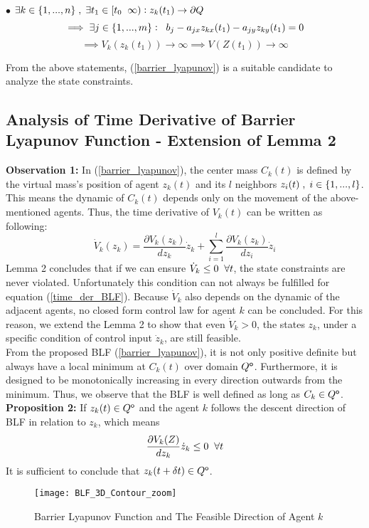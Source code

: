 \noindent $\bullet$ ${\exists k \in \{1,...,n\} \txtspc{,} \exists{t_1} \in  [t_0 \txtspc{ } \infty): z_k(t_1) \rightarrow \partial{Q}}$ 
\[\implies  \exists{j} \in \{1,...,m\}: \txtspc{} b_j - a_{jx}z_{kx}(t_1) - a_{jy}z_{ky}(t_1) = 0 \] 
\[\implies V_k(z_k(t_1)) \rightarrow \infty \implies V(Z(t_1)) \rightarrow \infty\] 

\noindent From the above statements, (\ref{barrier_lyapunov}) is a suitable candidate to analyze the state constraints.\\

\subsection {Analysis of Time Derivative of Barrier Lyapunov Function - Extension of Lemma 2} 
\noindent \textbf{Observation 1:} In (\ref{barrier_lyapunov}), the center mass ${C_k(t)}$ is defined by the virtual mass's position of agent ${z_k(t)}$ and its ${l}$ neighbors ${z_i(t) \txtspc{,} i \in \{1,...,l\}}$. This means the dynamic of ${C_k(t)}$ depends only on the movement of the above-mentioned agents. Thus, the time derivative of ${V_k(t)}$ can be written as following:
\begin{equation}
\label{time_der_BLF}
\dot V_k(z_k) = \frac{\partial V_k(z_k)}{dz_k}\dot z_k + \displaystyle\sum_{i=1}^{l} \frac{\partial V_k(z_k)}{dz_i} \dot z_i  
\end{equation}
Lemma 2 concludes that if we can ensure ${\dot V_k \leq 0 \txtspc{ }\forall t}$, the state constraints are never violated. Unfortunately this condition can not always be fulfilled for equation (\ref{time_der_BLF}). Because ${\dot{V}_k}$ also depends on the dynamic of the adjacent agents, no closed form control law for agent ${k}$ can be concluded. For this reason, we extend the Lemma 2 to show that even ${\dot V_k > 0}$, the states $z_k$, under a specific condition of control input $\dot z_k$, are still feasible. \\
From the proposed BLF (\ref{barrier_lyapunov}), it is not only positive definite but always have a local minimum at $C_k(t)$ over domain $Q^{\mathsf{o}}$. Furthermore, it is designed to be monotonically increasing in every direction outwards from the minimum. Thus, we observe that the BLF is well defined as long as $C_k \in Q^{\mathsf{o}}$.\\
\noindent \textbf{Proposition 2:} 
If $z_k(t) \in Q^{\mathsf{o}}$ and the agent $k$ follows the descent direction of BLF in relation to $z_k$, which means 
\[\frac{\partial V_k(Z)}{dz_k}\dot z_k \leq 0 \txtspc{ } \forall t\] 
\noindent It is sufficient to conclude that ${z_k(t + \delta t) \in Q^{\mathsf{o}}}$.\\
\begin{figure} %
	\centering
	\texttt{[image: BLF\_3D\_Contour\_zoom]}
	\caption{Barrier Lyapunov Function and The Feasible Direction of Agent $k$}
	\label{fig:Contour_3D}
\end{figure}

